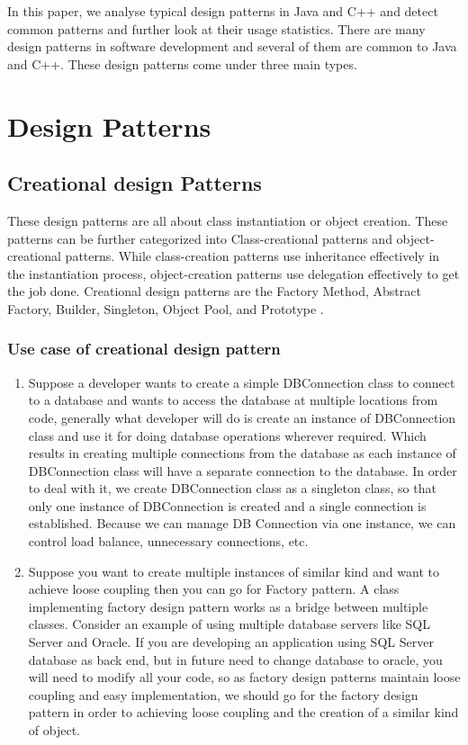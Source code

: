 \documentclass[sigplan,12pt,nonacm=true,review=false]{acmart}
\begin{document}
In this paper, we analyse typical design patterns in Java and C++ and detect common patterns and further look at their usage statistics. There are many design patterns in software development and several of them are common to Java and C++. These design patterns come under three main types.

\section{Design Patterns}
\subsection{Creational design Patterns}
These design patterns are all about class instantiation or object creation. These patterns can be further categorized into Class-creational patterns and object-creational patterns. While class-creation patterns use inheritance effectively in the instantiation process, object-creation patterns use delegation effectively to get the job done. Creational design patterns are the Factory Method, Abstract Factory, Builder, Singleton, Object Pool, and Prototype \cite{kuchana_software_2004, zimmer_relationships_1995}.

\subsubsection{Use case of creational design pattern}
\begin{enumerate}
    \item Suppose a developer wants to create a simple DBConnection class to connect to a database and wants to access the database at multiple locations from code, generally what developer will do is create an instance of DBConnection class and use it for doing database operations wherever required. Which results in creating multiple connections from the database as each instance of DBConnection class will have a separate connection to the database. In order to deal with it, we create DBConnection class as a singleton class, so that only one instance of DBConnection is created and a single connection is established. Because we can manage DB Connection via one instance, we can control load balance, unnecessary connections, etc.
    \item Suppose you want to create multiple instances of similar kind and want to achieve loose coupling then you can go for Factory pattern. A class implementing factory design pattern works as a bridge between multiple classes. Consider an example of using multiple database servers like SQL Server and Oracle. If you are developing an application using SQL Server database as back end, but in future need to change database to oracle, you will need to modify all your code, so as factory design patterns maintain loose coupling and easy implementation, we should go for the factory design pattern in order to achieving loose coupling and the creation of a similar kind of object.
\end{enumerate}
\end{document}
